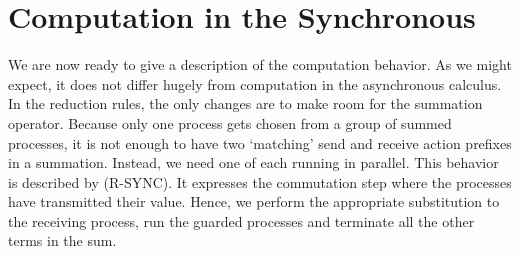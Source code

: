\section{Computation in the Synchronous \Picalc}
We are now ready to give a description of the computation behavior.  
As we might expect, it does not differ hugely from computation in the asynchronous calculus.  
In the reduction rules, the only changes are to make room for the summation operator.
Because only one process gets chosen from a group of summed processes, it is not enough to have two `matching' send and receive action prefixes in a summation.
Instead, we need one of each running in parallel.  This behavior is described by (R-SYNC).  
It expresses the commutation step where the processes have transmitted their value.  Hence, we perform the appropriate substitution to the receiving process, run the guarded processes and terminate all the other terms in the sum.

